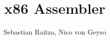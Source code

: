 \documentclass{lni}
\title{x86 Assembler}
\author{Sebastian Raitza, Nico von Geyso}
\begin{document}
\maketitle

\toc


















\end{document}
